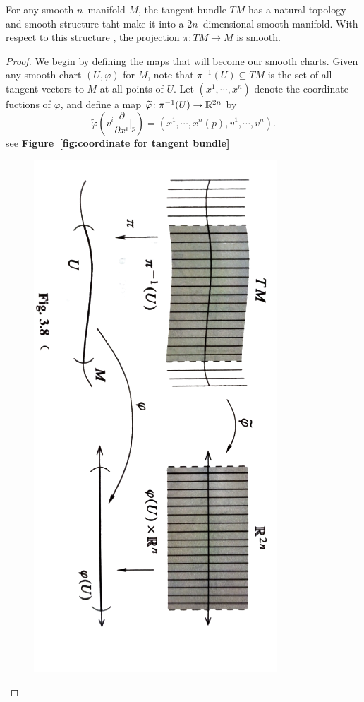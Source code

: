\begin{prop}
    For any smooth $n$--manifold $M$, the tangent bundle $TM$ has a natural topology and smooth structure taht make it into a $2n$--dimensional smooth manifold. With respect to this structure , the projection $\pi\colon TM\to M$ is smooth.
\end{prop}
\begin{proof}
    We begin by defining the maps that will become our smooth charts. Given any smooth chart $(U,\varphi)$ for $M$, note that $\pi^{-1}(U)\subseteq TM$ is the set of all tangent vectors to $M$ at all points of $U$. Let $(x^1,\cdots,x^n)$ denote the coordinate fuctions of $\varphi$, and define a map $\widetilde{\varphi}\colon \pi^{-1}(U)\to \mathbb{R}^{2n}$ by
    \begin{equation}
    \label{eq:natural coordinates on TM}\widetilde{\varphi}\left(v^i\frac{\partial}{\partial x^i}\bigg|_p\right)=(x^1,\cdots,x^n(p),v^1,\cdots,v^n).
    \end{equation}
    see \textbf{Figure~\ref{fig:coordinate for tangent bundle}}
    \begin{figure}[ht]
        \centering
        \includegraphics[angle=90,width=.7\linewidth]{figures/fog3.8.png}

\end{figure}
\end{proof}
